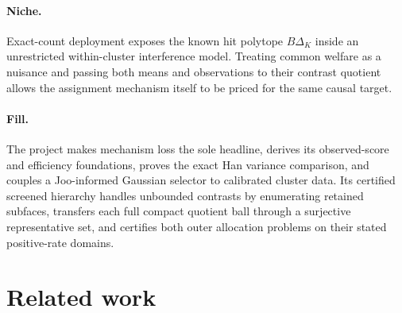 \documentclass{article}
\begin{document}
\paragraph{Niche.} Exact-count deployment exposes the known hit polytope \(B\Delta_K\) inside an unrestricted within-cluster interference model. Treating common welfare as a nuisance and passing both means and observations to their contrast quotient allows the assignment mechanism itself to be priced for the same causal target.

\paragraph{Fill.} The project makes mechanism loss the sole headline, derives its observed-score and efficiency foundations, proves the exact Han variance comparison, and couples a Joo-informed Gaussian selector to calibrated cluster data. Its certified screened hierarchy handles unbounded contrasts by enumerating retained subfaces, transfers each full compact quotient ball through a surjective representative set, and certifies both outer allocation problems on their stated positive-rate domains.

\section{Related work}
\end{document}
